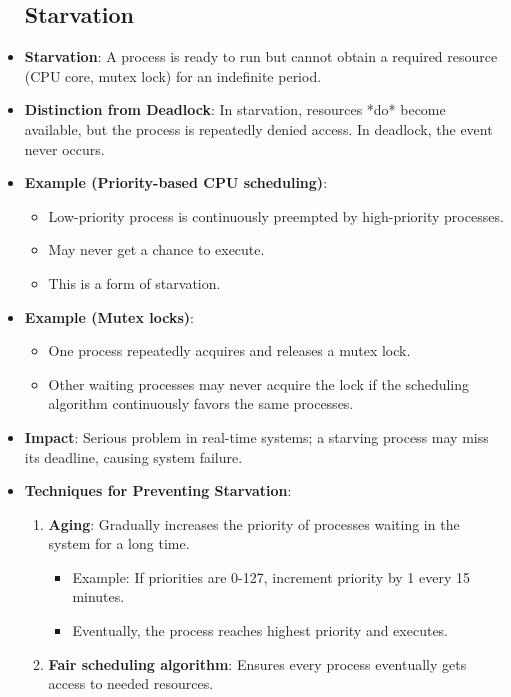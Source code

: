 \begin{itemize}
    \subsection{Starvation}
    \item \textbf{Starvation}: A process is ready to run but cannot obtain a required resource (CPU core, mutex lock) for an indefinite period.
    \item \textbf{Distinction from Deadlock}: In starvation, resources *do* become available, but the process is repeatedly denied access. In deadlock, the event never occurs.
    \item \textbf{Example (Priority-based CPU scheduling)}:
    \begin{itemize}
        \item Low-priority process is continuously preempted by high-priority processes.
        \item May never get a chance to execute.
        \item This is a form of starvation.
    \end{itemize}
    \item \textbf{Example (Mutex locks)}:
    \begin{itemize}
        \item One process repeatedly acquires and releases a mutex lock.
        \item Other waiting processes may never acquire the lock if the scheduling algorithm continuously favors the same processes.
    \end{itemize}
    \item \textbf{Impact}: Serious problem in real-time systems; a starving process may miss its deadline, causing system failure.
    \item \textbf{Techniques for Preventing Starvation}:
    \begin{enumerate}
        \item \textbf{Aging}: Gradually increases the priority of processes waiting in the system for a long time.
        \begin{itemize}
            \item Example: If priorities are 0-127, increment priority by 1 every 15 minutes.
            \item Eventually, the process reaches highest priority and executes.
        \end{itemize}
        \item \textbf{Fair scheduling algorithm}: Ensures every process eventually gets access to needed resources.
    \end{enumerate}
\end{itemize}

